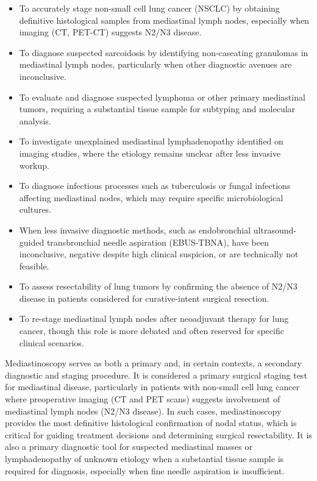\begin{itemize}
  \item To accurately stage non-small cell lung cancer (NSCLC) by obtaining definitive histological samples from mediastinal lymph nodes, especially when imaging (CT, PET-CT) suggests N2/N3 disease.
  \item To diagnose suspected sarcoidosis by identifying non-caseating granulomas in mediastinal lymph nodes, particularly when other diagnostic avenues are inconclusive.
  \item To evaluate and diagnose suspected lymphoma or other primary mediastinal tumors, requiring a substantial tissue sample for subtyping and molecular analysis.
  \item To investigate unexplained mediastinal lymphadenopathy identified on imaging studies, where the etiology remains unclear after less invasive workup.
  \item To diagnose infectious processes such as tuberculosis or fungal infections affecting mediastinal nodes, which may require specific microbiological cultures.
  \item When less invasive diagnostic methods, such as endobronchial ultrasound-guided transbronchial needle aspiration (EBUS-TBNA), have been inconclusive, negative despite high clinical suspicion, or are technically not feasible.
  \item To assess resectability of lung tumors by confirming the absence of N2/N3 disease in patients considered for curative-intent surgical resection.
  \item To re-stage mediastinal lymph nodes after neoadjuvant therapy for lung cancer, though this role is more debated and often reserved for specific clinical scenarios.
\end{itemize}

Mediastinoscopy serves as both a primary and, in certain contexts, a secondary diagnostic and staging procedure. It is considered a primary surgical staging test for mediastinal disease, particularly in patients with non-small cell lung cancer where preoperative imaging (CT and PET scans) suggests involvement of mediastinal lymph nodes (N2/N3 disease). In such cases, mediastinoscopy provides the most definitive histological confirmation of nodal status, which is critical for guiding treatment decisions and determining surgical resectability. It is also a primary diagnostic tool for suspected mediastinal masses or lymphadenopathy of unknown etiology when a substantial tissue sample is required for diagnosis, especially when fine needle aspiration is insufficient.

